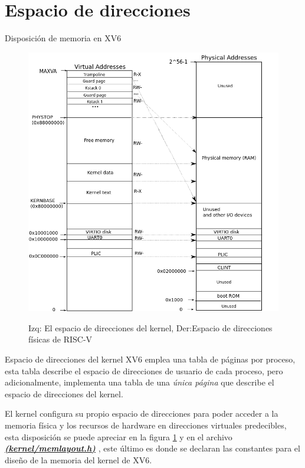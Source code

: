 \documentclass{libs/ufc_format}
\begin{document}
\section{Espacio de direcciones}
\begin{frame}{Disposición de memoria en XV6}
  \begin{figure}
    \centering
    \caption{Izq: El espacio de direcciones del kernel, Der:Espacio de direcciones físicas de RISC-V \cite{xv6_book}}
    \includegraphics[scale=0.2]{libs/img/xv6_layout.png}
    \label{fig:esquema_dir_kernel}
  \end{figure}
\end{frame}
\begin{frame}{Espacio de direcciones del kernel}
  XV6 emplea una tabla de páginas por proceso, esta tabla describe el espacio de direcciones de usuario de cada proceso, pero adicionalmente, implementa una tabla de una \emph{única página} que describe el espacio de direcciones del kernel.

  \vspace{0.3cm}

  El kernel configura su propio espacio de direcciones para poder acceder a la memoria física y los recursos de hardware en direcciones virtuales predecibles, esta disposición se puede apreciar en la figura \ref{fig:esquema_dir_kernel} y en el archivo \href{https://github.com/CarlosSandoval-03/xv6-riscv/blob/riscv/kernel/memlayout.h}{\textbf{\textit{(kernel/memlayout.h)}}} \cite{xv6}, este último es donde se declaran las constantes para el diseño de la memoria del kernel de XV6. \cite{xv6_book}
\end{frame}
\end{document}
